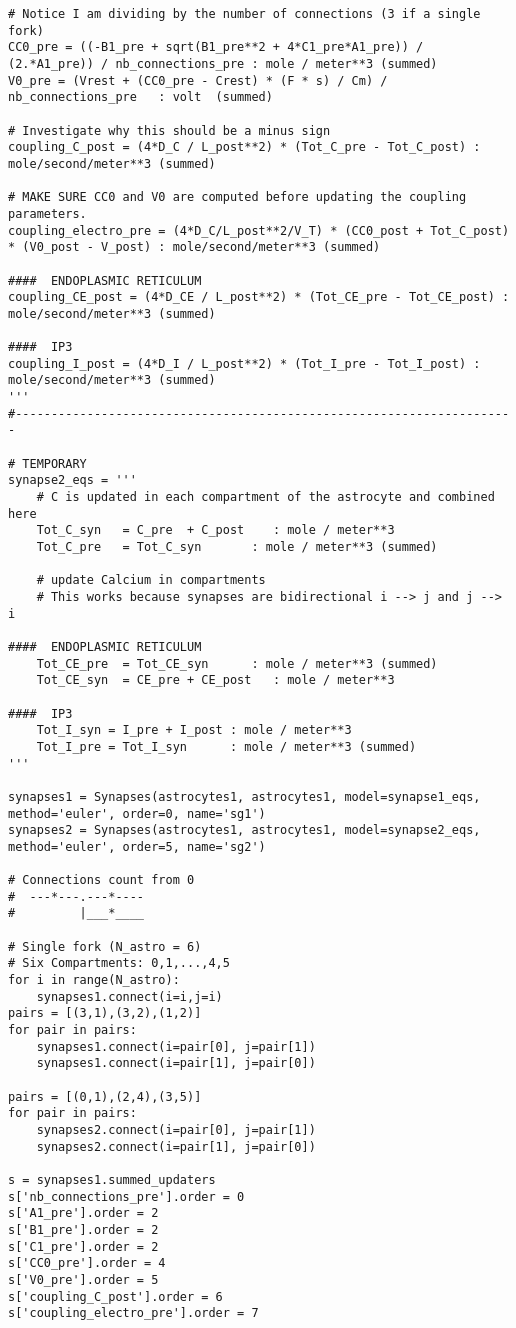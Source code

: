 \documentclass{article}
\begin{document}
\begin{verbatim}
# Notice I am dividing by the number of connections (3 if a single fork)
CC0_pre = ((-B1_pre + sqrt(B1_pre**2 + 4*C1_pre*A1_pre)) / (2.*A1_pre)) / nb_connections_pre : mole / meter**3 (summed)
V0_pre = (Vrest + (CC0_pre - Crest) * (F * s) / Cm) / nb_connections_pre   : volt  (summed)

# Investigate why this should be a minus sign
coupling_C_post = (4*D_C / L_post**2) * (Tot_C_pre - Tot_C_post) : mole/second/meter**3 (summed)

# MAKE SURE CC0 and V0 are computed before updating the coupling parameters. 
coupling_electro_pre = (4*D_C/L_post**2/V_T) * (CC0_post + Tot_C_post) * (V0_post - V_post) : mole/second/meter**3 (summed) 

####  ENDOPLASMIC RETICULUM
coupling_CE_post = (4*D_CE / L_post**2) * (Tot_CE_pre - Tot_CE_post) : mole/second/meter**3 (summed)

####  IP3
coupling_I_post = (4*D_I / L_post**2) * (Tot_I_pre - Tot_I_post) : mole/second/meter**3 (summed)
'''
#----------------------------------------------------------------------

# TEMPORARY
synapse2_eqs = '''
    # C is updated in each compartment of the astrocyte and combined here
	Tot_C_syn   = C_pre  + C_post    : mole / meter**3
	Tot_C_pre   = Tot_C_syn       : mole / meter**3 (summed)

	# update Calcium in compartments
	# This works because synapses are bidirectional i --> j and j --> i

####  ENDOPLASMIC RETICULUM
	Tot_CE_pre  = Tot_CE_syn      : mole / meter**3 (summed)
	Tot_CE_syn  = CE_pre + CE_post   : mole / meter**3

####  IP3
	Tot_I_syn = I_pre + I_post : mole / meter**3
	Tot_I_pre = Tot_I_syn      : mole / meter**3 (summed)
'''

synapses1 = Synapses(astrocytes1, astrocytes1, model=synapse1_eqs, method='euler', order=0, name='sg1')
synapses2 = Synapses(astrocytes1, astrocytes1, model=synapse2_eqs, method='euler', order=5, name='sg2')

# Connections count from 0
#  ---*---.---*----
#         |___*____

# Single fork (N_astro = 6)
# Six Compartments: 0,1,...,4,5
for i in range(N_astro):
    synapses1.connect(i=i,j=i)
pairs = [(3,1),(3,2),(1,2)]
for pair in pairs:
	synapses1.connect(i=pair[0], j=pair[1])
	synapses1.connect(i=pair[1], j=pair[0])

pairs = [(0,1),(2,4),(3,5)]
for pair in pairs:
	synapses2.connect(i=pair[0], j=pair[1])
	synapses2.connect(i=pair[1], j=pair[0])

s = synapses1.summed_updaters
s['nb_connections_pre'].order = 0
s['A1_pre'].order = 2
s['B1_pre'].order = 2
s['C1_pre'].order = 2
s['CC0_pre'].order = 4
s['V0_pre'].order = 5
s['coupling_C_post'].order = 6
s['coupling_electro_pre'].order = 7
\end{verbatim}
\end{document}

